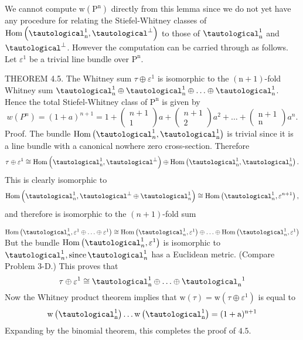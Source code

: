 \documentclass[10pt]{article}
\begin{document}
We cannot compute $\mathrm{w}\left(\mathrm{P}^{\mathrm{n}}\right)$ directly from this lemma since we do not yet have any procedure for relating the Stiefel-Whitney classes of $\operatorname{Hom}\left(\tautological_{\mathrm{n}}^{1}, \tautological^{\perp}\right)$ to those of $\tautological_{\mathrm{n}}^{1}$ and $\tautological^{\perp}$. However the computation can be carried through as follows. Let $\varepsilon^{1}$ be a trivial line bundle over $\mathrm{P}^{\mathrm{n}}$.

THEOREM 4.5. The Whitney sum $\tau \oplus \varepsilon^{1}$ is isomorphic to the $(\mathrm{n}+1)$-fold Whitney sum $\tautological_{\mathrm{n}}^{1} \oplus \tautological_{\mathrm{n}}^{1} \oplus \ldots \oplus \tautological_{\mathrm{n}}^{1}$. Hence the total Stiefel-Whitney class of $\mathrm{P}^{\mathrm{n}}$ is given by
$$
w\left(P^{n}\right)=(1+a)^{n+1}=1+\left(\begin{array}{c}
n+1 \\
1
\end{array}\right) a+\left(\begin{array}{c}
n+1 \\
2
\end{array}\right) a^{2}+\ldots+\left(\begin{array}{c}
\mathrm{n}+1 \\
\mathrm{n}
\end{array}\right) a^{n} .
$$
Proof. The bundle $\operatorname{Hom}\left(\tautological_{n}^{1}, \tautological_{\mathrm{n}}^{1}\right)$ is trivial since it is a line bundle with a canonical nowhere zero cross-section. Therefore
$$
\tau \oplus \varepsilon^{1} \cong \operatorname{Hom}\left(\tautological_{\mathrm{n}}^{1}, \tautological^{\perp}\right) \oplus \operatorname{Hom}\left(\tautological_{\mathrm{n}}^{1}, \tautological_{\mathrm{n}}^{1}\right) .
$$
This is clearly isomorphic to
$$
\operatorname{Hom}\left(\tautological_{n}^{1}, \tautological^{\perp} \oplus \tautological_{n}^{1}\right) \cong \operatorname{Hom}\left(\tautological_{n}^{1}, \varepsilon^{n+1}\right),
$$
and therefore is isomorphic to the $(n+1)$-fold sum

$\operatorname{Hom}\left(\tautological_{n}^{1}, \varepsilon^{1} \oplus \ldots \oplus \varepsilon^{1}\right) \cong \operatorname{Hom}\left(\tautological_{n}^{1}, \varepsilon^{1}\right) \oplus \ldots \oplus \operatorname{Hom}\left(\tautological_{n}^{1}, \varepsilon^{1}\right)$ But the bundle $\operatorname{Hom}\left(\tautological_{n}^{1}, \varepsilon^{1}\right)$ is isomorphic to $\tautological_{n}^{1}, \operatorname{since} \tautological_{n}^{1}$ has a Euclidean metric. (Compare Problem 3-D.) This proves that
$$
\tau \oplus \varepsilon^{1} \cong \tautological_{\mathrm{n}}^{1} \oplus \ldots \oplus \tautological_{\mathrm{n}}{ }^{1}
$$
Now the Whitney product theorem implies that $\mathrm{w}(\tau)=\mathrm{w}\left(\tau \oplus \varepsilon^{1}\right)$ is equal to
$$
\mathrm{w}\left(\tautological_{\mathrm{n}}^{1}\right) \ldots \mathrm{w}\left(\tautological_{\mathrm{n}}^{1}\right)=(1+\mathrm{a})^{\mathrm{n}+1}
$$
Expanding by the binomial theorem, this completes the proof of $4.5$.
\end{document}
